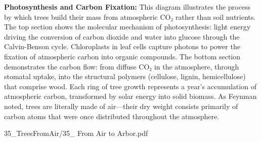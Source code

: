 \begin{SideNotePage}{
  \textbf{Photosynthesis and Carbon Fixation:} This diagram illustrates the process by which trees build their mass from atmospheric CO₂ rather than soil nutrients. The top section shows the molecular mechanism of photosynthesis: light energy driving the conversion of carbon dioxide and water into glucose through the Calvin-Benson cycle. Chloroplasts in leaf cells capture photons to power the fixation of atmospheric carbon into organic compounds. The bottom section demonstrates the carbon flow: from diffuse CO₂ in the atmosphere, through stomatal uptake, into the structural polymers (cellulose, lignin, hemicellulose) that comprise wood. Each ring of tree growth represents a year's accumulation of atmospheric carbon, transformed by solar energy into solid biomass. As Feynman noted, trees are literally \QSOpen{}made of air\QSClose{}—their dry weight consists primarily of carbon atoms that were once distributed throughout the atmosphere. \par
}{35_TreesFromAir/35_ From Air to Arbor.pdf}
\end{SideNotePage}
